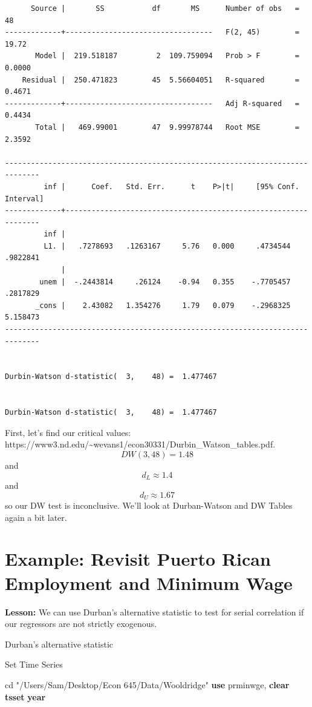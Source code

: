 \documentclass[
]{book}
\newenvironment{Shaded}{\begin{snugshade}}{\end{snugshade}}
\newcommand{\FunctionTok}[1]{\textcolor[rgb]{0.13,0.29,0.53}{\textbf{#1}}}
\newcommand{\KeywordTok}[1]{\textcolor[rgb]{0.13,0.29,0.53}{\textbf{#1}}}
\newcommand{\NormalTok}[1]{#1}
\newcommand{\StringTok}[1]{\textcolor[rgb]{0.31,0.60,0.02}{#1}}
\begin{document}
\begin{verbatim}
      Source |       SS           df       MS      Number of obs   =        48
-------------+----------------------------------   F(2, 45)        =     19.72
       Model |  219.518187         2  109.759094   Prob > F        =    0.0000
    Residual |  250.471823        45  5.56604051   R-squared       =    0.4671
-------------+----------------------------------   Adj R-squared   =    0.4434
       Total |   469.99001        47  9.99978744   Root MSE        =    2.3592

------------------------------------------------------------------------------
         inf |      Coef.   Std. Err.      t    P>|t|     [95% Conf. Interval]
-------------+----------------------------------------------------------------
         inf |
         L1. |   .7278693   .1263167     5.76   0.000     .4734544    .9822841
             |
        unem |  -.2443814     .26124    -0.94   0.355    -.7705457    .2817829
       _cons |    2.43082   1.354276     1.79   0.079    -.2968325    5.158473
------------------------------------------------------------------------------


Durbin-Watson d-statistic(  3,    48) =  1.477467


Durbin-Watson d-statistic(  3,    48) =  1.477467
\end{verbatim}

First, let's find our critical values:
https://www3.nd.edu/\textasciitilde wevans1/econ30331/Durbin\_Watson\_tables.pdf.
\[ DW(3,48)=1.48 \] and \[ d_L \approx 1.4 \] and \[ d_U \approx 1.67 \]
so our DW test is inconclusive. We'll look at Durban-Watson and DW Tables again a bit later.

\section{Example: Revisit Puerto Rican Employment and Minimum Wage}\label{example-revisit-puerto-rican-employment-and-minimum-wage}

\textbf{Lesson:} We can use Durban's alternative statistic to test for serial correlation
if our regressors are not strictly exogenous.

Durban's alternative statistic

Set Time Series

\begin{Shaded}
\begin{Highlighting}[]
\NormalTok{cd }\StringTok{"/Users/Sam/Desktop/Econ 645/Data/Wooldridge"}
\KeywordTok{use}\NormalTok{ prminwge, }\KeywordTok{clear}
\KeywordTok{tsset} \FunctionTok{year}
\end{Highlighting}
\end{Shaded}
\end{document}
